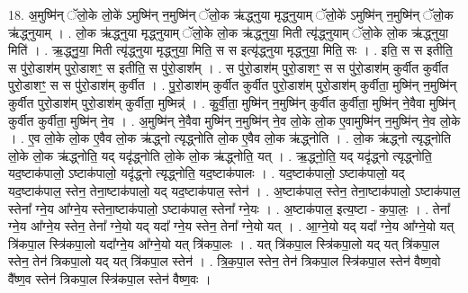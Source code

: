 \documentclass[17pt]{extarticle}
\begin{document}
18. अ॒मुष्मि॑न् ॅलो॒के लो॒के॑ ऽमुष्मि॑न् न॒मुष्मि॑न् ॅलो॒क ऋ॑द्ध्नुया मृद्ध्नुयाम् ॅलो॒के॑ ऽमुष्मि॑न् न॒मुष्मि॑न् ॅलो॒क ऋ॑द्ध्नुयाम् । . लो॒क ऋ॑द्ध्नुया मृद्ध्नुयाम् ॅलो॒के लो॒क ऋ॑द्ध्नुया॒ मिती त्यृ॑द्ध्नुयाम् ॅलो॒के लो॒क ऋ॑द्ध्नुया॒ मिति॑ । . ऋ॒द्ध्नु॒या॒ मिती त्यृ॑द्ध्नुया मृद्ध्नुया॒ मिति॒ स स इत्यृ॑द्ध्नुया मृद्ध्नुया॒ मिति॒ सः । . इति॒ स स इतीति॒ स पु॑रो॒डाश॑म् पुरो॒डाशꣳ॒॒ स इतीति॒ स पु॑रो॒डाश᳚म् । . स पु॑रो॒डाश॑म् पुरो॒डाशꣳ॒॒ स स पु॑रो॒डाश॑म् कुर्वीत कुर्वीत पुरो॒डाशꣳ॒॒ स स पु॑रो॒डाश॑म् कुर्वीत । . पु॒रो॒डाश॑म् कुर्वीत कुर्वीत पुरो॒डाश॑म् पुरो॒डाश॑म् कुर्वीता॒ मुष्मि॑न् न॒मुष्मि॑न् कुर्वीत पुरो॒डाश॑म् पुरो॒डाश॑म् कुर्वीता॒ मुष्मिन्न्॑ । . कु॒र्वी॒ता॒ मुष्मि॑न् न॒मुष्मि॑न् कुर्वीत कुर्वीता॒ मुष्मि॑न् ने॒वैवा मुष्मि॑न् कुर्वीत कुर्वीता॒ मुष्मि॑न् ने॒व । . अ॒मुष्मि॑न् ने॒वैवा मुष्मि॑न् न॒मुष्मि॑न् ने॒व लो॒के लो॒क ए॒वामुष्मि॑न् न॒मुष्मि॑न् ने॒व लो॒के । . ए॒व लो॒के लो॒क ए॒वैव लो॒क ऋ॑द्ध्नो त्यृद्ध्नोति लो॒क ए॒वैव लो॒क ऋ॑द्ध्नोति । . लो॒क ऋ॑द्ध्नो त्यृद्ध्नोति लो॒के लो॒क ऋ॑द्ध्नोति॒ यद् यदृ॑द्ध्नोति लो॒के लो॒क ऋ॑द्ध्नोति॒ यत् । . ऋ॒द्ध्नो॒ति॒ यद् यदृ॑द्ध्नो त्यृद्ध्नोति॒ यद॒ष्टाक॑पालो॒ ऽष्टाक॑पालो॒ यदृ॑द्ध्नो त्यृद्ध्नोति॒ यद॒ष्टाक॑पालः । . यद॒ष्टाक॑पालो॒ ऽष्टाक॑पालो॒ यद् यद॒ष्टाक॑पाल॒ स्तेन॒ तेना॒ष्टाक॑पालो॒ यद् यद॒ष्टाक॑पाल॒ स्तेन॑ । . अ॒ष्टाक॑पाल॒ स्तेन॒ तेना॒ष्टाक॑पालो॒ ऽष्टाक॑पाल॒ स्तेना᳚ ग्ने॒य आ᳚ग्ने॒य स्तेना॒ष्टाक॑पालो॒ ऽष्टाक॑पाल॒ स्तेना᳚ ग्ने॒यः । . अ॒ष्टाक॑पाल॒ इत्य॒ष्टा - क॒पा॒लः॒ । . तेना᳚ ग्ने॒य आ᳚ग्ने॒य स्तेन॒ तेना᳚ ग्ने॒यो यद् यदा᳚ ग्ने॒य स्तेन॒ तेना᳚ ग्ने॒यो यत् । . आ॒ग्ने॒यो यद् यदा᳚ ग्ने॒य आ᳚ग्ने॒यो यत् त्रि॑कपा॒ल स्त्रि॑कपा॒लो यदा᳚ग्ने॒य आ᳚ग्ने॒यो यत् त्रि॑कपा॒लः । . यत् त्रि॑कपा॒ल स्त्रि॑कपा॒लो यद् यत् त्रि॑कपा॒ल स्तेन॒ तेन॑ त्रिकपा॒लो यद् यत् त्रि॑कपा॒ल स्तेन॑ । . त्रि॒क॒पा॒ल स्तेन॒ तेन॑ त्रिकपा॒ल स्त्रि॑कपा॒ल स्तेन॑ वैष्ण॒वो वै᳚ष्ण॒व स्तेन॑ त्रिकपा॒ल स्त्रि॑कपा॒ल स्तेन॑ वैष्ण॒वः । \newline
\end{document}

